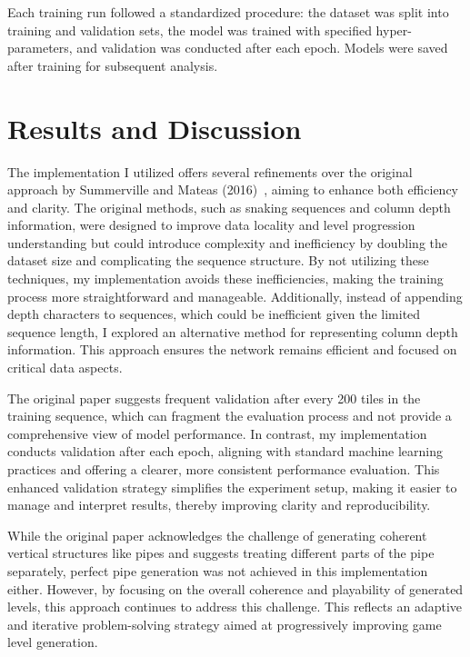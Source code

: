 \documentclass[runningheads]{llncs}
\begin{document}
Each training run followed a standardized procedure: the dataset was split into training and validation sets, the model was trained with specified hyper-parameters, and validation was conducted after each epoch. Models were saved after training for subsequent analysis.




\section{Results and Discussion}
The implementation I utilized\cite{ref_article30} offers several refinements over the original approach by Summerville and Mateas (2016)~\cite{ref_article14}, aiming to enhance both efficiency and clarity. The original methods, such as snaking sequences and column depth information, were designed to improve data locality and level progression understanding but could introduce complexity and inefficiency by doubling the dataset size and complicating the sequence structure. By not utilizing these techniques, my implementation avoids these inefficiencies, making the training process more straightforward and manageable. Additionally, instead of appending depth characters to sequences, which could be inefficient given the limited sequence length, I explored an alternative method for representing column depth information. This approach ensures the network remains efficient and focused on critical data aspects.

The original paper suggests frequent validation after every 200 tiles in the training sequence, which can fragment the evaluation process and not provide a comprehensive view of model performance. In contrast, my implementation conducts validation after each epoch, aligning with standard machine learning practices and offering a clearer, more consistent performance evaluation. This enhanced validation strategy simplifies the experiment setup, making it easier to manage and interpret results, thereby improving clarity and reproducibility.

While the original paper acknowledges the challenge of generating coherent vertical structures like pipes and suggests treating different parts of the pipe separately, perfect pipe generation was not achieved in this implementation either. However, by focusing on the overall coherence and playability of generated levels, this approach continues to address this challenge. This reflects an adaptive and iterative problem-solving strategy aimed at progressively improving game level generation.
\end{document}
